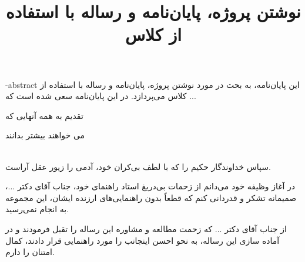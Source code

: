 \subject{ریاضی محض}
\title{نوشتن پروژه، پایان‌نامه و رساله با استفاده از کلاس 
}
\fa-abstract{
این پایان‌نامه، به بحث در مورد نوشتن پروژه، پایان‌نامه و رساله با استفاده از کلاس 
می‌پردازد. در این پایان‌نامه سعی شده است که ...
}
\vtitle
\begin{acknowledgementpage}

\vspace{4cm}

{\nastaliq
{\Huge
 تقدیم به همه آنهایی که 
\vspace{1.5cm}

\hspace{3cm}
می خواهند بیشتر بدانند
}}
\end{acknowledgementpage}
\newpage
\thispagestyle{empty}
\\[2cm]
سپاس خداوندگار حکیم را که با لطف بی‌کران خود، آدمی را زیور عقل آراست.


در آغاز وظیفه‌  خود  می‌دانم از زحمات بی‌دریغ استاد  راهنمای خود،  جناب آقای دکتر  ...، صمیمانه تشکر
و  قدردانی کنم  که قطعاً بدون 
راهنمایی‌های ارزنده‌  ایشان، این مجموعه  به انجام  نمی‌رسید.

از جناب  آقای  دکتر ...   که زحمت  مطالعه و مشاوره‌  این رساله
را تقبل  فرمودند و
در آماده سازی  این رساله، به نحو احسن اینجانب را مورد راهنمایی قرار دادند، کمال امتنان را دارم.

